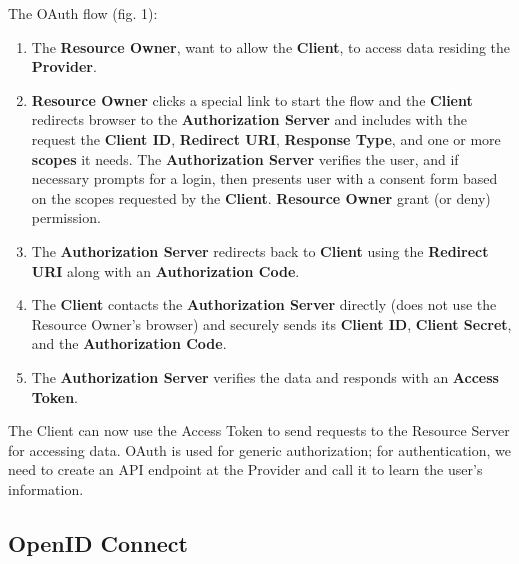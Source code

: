 	The OAuth flow (fig. 1):
	\begin{enumerate}
		\item The \textbf{Resource Owner}, want to allow the \textbf{Client}, to access data residing the \textbf{Provider}.
		
		\item \textbf{Resource Owner} clicks a special link to start the flow and the \textbf{Client} redirects browser to the \textbf{Authorization Server} and includes with the request the \textbf{Client ID}, \textbf{Redirect URI}, \textbf{Response Type}, and one or more \textbf{scopes} it needs. The \textbf{Authorization Server} verifies the user, and if necessary prompts for a login, then presents user with a consent form based on the scopes requested by the \textbf{Client}. \textbf{Resource Owner} grant (or deny) permission.
		
		\item The \textbf{Authorization Server} redirects back to \textbf{Client} using the \textbf{Redirect URI} along with an \textbf{Authorization Code}.
		
		\item The \textbf{Client} contacts the \textbf{Authorization Server} directly (does not use the Resource Owner’s browser) and securely sends its \textbf{Client ID}, \textbf{Client Secret}, and the \textbf{Authorization Code}.
		
		\item The \textbf{Authorization Server} verifies the data and responds with an \textbf{Access Token}.
		
	\end{enumerate}
The Client can now use the Access Token to send requests to the Resource Server for accessing data. OAuth is used for generic authorization; for authentication, we need to create an API endpoint at the Provider and call it to learn the user's information.



\subsection{OpenID Connect}

